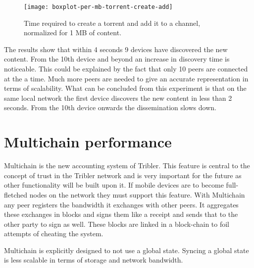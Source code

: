 \begin{figure}[H]
	\centering
	\texttt{[image: boxplot-per-mb-torrent-create-add]}
	\caption{Time required to create a torrent and add it to a channel, normalized for 1 MB of content.}
	\label{fig:boxplot-per-mb-torrent-create-add}
\end{figure}
The results show that within 4 seconds 9 devices have discovered the new content.
From the 10th device and beyond an increase in discovery time is noticeable.
This could be explained by the fact that only 10 peers are connected at the a time.
Much more peers are needed to give an accurate representation in terms of scalability.
What can be concluded from this experiment is that on the same local network the first device discovers the new content in less than 2 seconds.
From the 10th device onwards the dissemination slows down.


\section{Multichain performance}
Multichain is the new accounting system of Tribler.
This feature is central to the concept of trust in the Tribler network and is very important for the future as other functionality will be built upon it.
If mobile devices are to become full-fletched nodes on the network they must support this feature.
With Multichain any peer registers the bandwidth it exchanges with other peers.
It aggregates these exchanges in blocks and signs them like a receipt and sends that to the other party to sign as well.
These blocks are linked in a block-chain to foil attempts of cheating the system.

Multichain is explicitly designed to not use a global state.
Syncing a global state is less scalable in terms of storage and network bandwidth.

